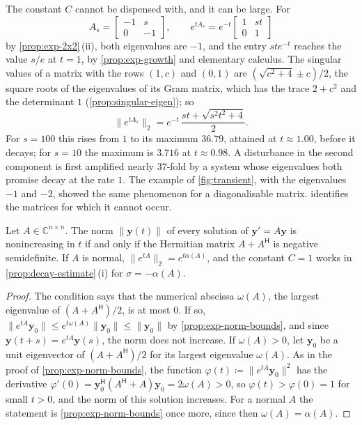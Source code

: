 The constant $C$ cannot be dispensed with, and it can be large. For
\[
A_s=\begin{bmatrix}-1&s\\0&-1\end{bmatrix},\qquad e^{tA_s}=e^{-t}\begin{bmatrix}1&st\\0&1\end{bmatrix}
\]
by \cref{prop:exp-2x2}\,(ii), both eigenvalues are $-1$, and the entry $ste^{-t}$ reaches the value $s/e$ at $t=1$, by \cref{prop:exp-growth} and elementary calculus. The singular values of a matrix with the rows $(1,c)$ and $(0,1)$ are $(\sqrt{c^2+4}\pm c)/2$, the square roots of the eigenvalues of its Gram matrix, which has the trace $2+c^2$ and the determinant $1$ (\cref{prop:singular-eigen}); so
\[
\|e^{tA_s}\|_2=e^{-t}\,\frac{st+\sqrt{s^2t^2+4}}2 .
\]
For $s=100$ this rises from $1$ to its maximum $36.79$, attained at $t\approx1.00$, before it decays; for $s=10$ the maximum is $3.716$ at $t\approx0.98$. A disturbance in the second component is first amplified nearly $37$-fold by a system whose eigenvalues both promise decay at the rate $1$. The example of \cref{fig:transient}, with the eigenvalues $-1$ and $-2$, showed the same phenomenon for a diagonalisable matrix.  identifies the matrices for which it cannot occur.

\begin{corollary}
\label{cor:monotone-decay}
Let $A\in\mathbb C^{n\times n}$. The norm $\|\mathbf y(t)\|$ of every solution of $\mathbf y'=A\mathbf y$ is nonincreasing in $t$ if and only if the Hermitian matrix $A+A^{\mathsf H}$ is negative semidefinite. If $A$ is normal, $\|e^{tA}\|_2=e^{t\alpha(A)}$, and the constant $C=1$ works in \cref{prop:decay-estimate}\,(i) for $\sigma=-\alpha(A)$.
\end{corollary}

\begin{proof}
The condition says that the numerical abscissa $\omega(A)$, the largest eigenvalue of $(A+A^{\mathsf H})/2$, is at most $0$. If so, $\|e^{tA}\mathbf y_0\|\le e^{t\omega(A)}\|\mathbf y_0\|\le\|\mathbf y_0\|$ by \cref{prop:exp-norm-bounds}, and since $\mathbf y(t+s)=e^{tA}\mathbf y(s)$, the norm does not increase. If $\omega(A)>0$, let $\mathbf y_0$ be a unit eigenvector of $(A+A^{\mathsf H})/2$ for its largest eigenvalue $\omega(A)$. As in the proof of \cref{prop:exp-norm-bounds}, the function $\varphi(t)\coloneqq\|e^{tA}\mathbf y_0\|^2$ has the derivative $\varphi'(0)=\mathbf y_0^{\mathsf H}(A^{\mathsf H}+A)\mathbf y_0=2\omega(A)>0$, so $\varphi(t)>\varphi(0)=1$ for small $t>0$, and the norm of this solution increases. For a normal $A$ the statement is \cref{prop:exp-norm-bounds} once more, since then $\omega(A)=\alpha(A)$.
\end{proof}


